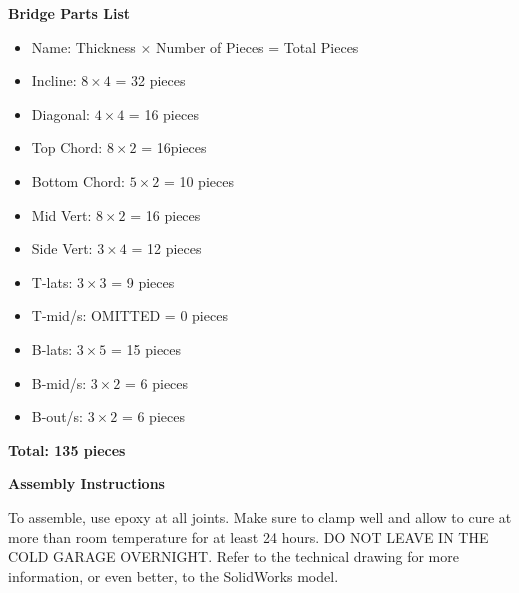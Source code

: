 \documentclass[11pt]{article}
\begin{document}
\begin{center}
    \LARGE \textbf{Bridge Parts List}
\end{center}
\bigskip

\begin{itemize}
    \item Name: Thickness $\times$ Number of Pieces = Total Pieces
    \item Incline: $8 \times 4$ = 32 pieces
    \item Diagonal: $4 \times 4$ = 16 pieces
    \item Top Chord: $8 \times 2$ = 16pieces
    \item Bottom Chord: $5 \times 2$ = 10 pieces
    \item Mid Vert: $8 \times 2$ = 16 pieces
    \item Side Vert: $3 \times 4$ = 12 pieces
    \item T-lats: $3 \times 3$ = 9 pieces
    \item T-mid/s: OMITTED = 0 pieces
    \item B-lats: $3 \times 5$ = 15 pieces
    \item B-mid/s: $3 \times 2$ = 6 pieces
    \item B-out/s: $3 \times 2$ = 6 pieces
\end{itemize}

\textbf{Total: 135 pieces}

\vspace{2em}

\begin{center}
    \LARGE \textbf{Assembly Instructions}\end{center}
\begin{center}
\bigskip

    To assemble, use epoxy at all joints. Make sure to clamp well and allow to cure at more than room temperature for at least 24 hours. DO NOT LEAVE IN THE COLD GARAGE OVERNIGHT. Refer to the technical drawing for more information, or even better, to the SolidWorks model.
\end{center}
\end{document}
